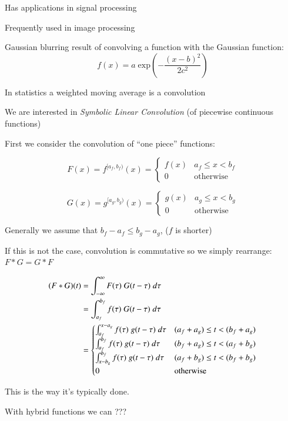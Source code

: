 Has applications in signal processing

Frequently used in image processing

  Gaussian blurring result of convolving a function with the Gaussian function:
\begin{equation}
	f(x) = a \; \text{exp} \left( - \frac{(x-b)^2}{2c^2} \right)
\end{equation}

In statistics a weighted moving average is a convolution

We are interested in \emph{Symbolic Linear Convolution} (of piecewise continuous functions)

First we consider the convolution of ``one piece'' functions:

\begin{equation}
	F(x)=f^{[a_f,b_f)}(x) = 
		\begin{cases}
			f(x) & a_f \leq x < b_f \\
			0 & \text{otherwise}
		\end{cases}
\end{equation}

\begin{equation}
	G(x)=g^{[a_g,b_g)}(x) = 
		\begin{cases}
			g(x) & a_g \leq x < b_g \\
			0 & \text{otherwise}
		\end{cases}
\end{equation}

Generally we assume that $b_f - a_f \leq b_g - a_g$, ($f$ is shorter)

If this is not the case, convolution is commutative so we simply rearrange: $F * G = G * F$

\begin{align}
	(F*G)(t) 
	&= \int_{-\infty}^\infty F(\tau)\; G(t-\tau) \; d\tau \notag \\
	&= \int_{a_f}^{b_f} f(\tau) \; G(t-\tau) \; d\tau \notag \\
	&= 	\begin{cases}
			\int_{a_f}^{x-a_g} f(\tau) \; g(t-\tau) \; d\tau 	& (a_f+a_g) \leq t < (b_f+a_g) \\
			\int_{a_f}^{b_f} f(\tau) \; g(t-\tau) \; d\tau		& (b_f+a_g) \leq t < (a_f+b_g) \\
			\int_{x-b_g}^{b_f} f(\tau) \; g(t-\tau) \; d\tau	& (a_f+b_g) \leq t < (b_f+b_g) \\
			0										& \text{otherwise}
		\end{cases}
\end{align}


This is the way it's typically done.

With hybrid functions we can ???


\newpage
